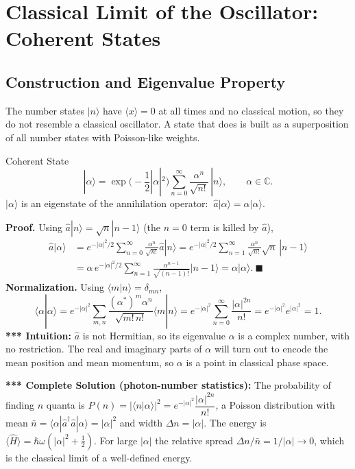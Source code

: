 \documentclass[11pt,a4paper]{article}
\begin{document}
\section{Classical Limit of the Oscillator: Coherent States}
\label{fd:sec:coh}

\subsection{Construction and Eigenvalue Property}
The number states $|n\rangle$ have $\langle x\rangle=0$ at all times and no classical motion, so they do not resemble a classical oscillator. A state that does is built as a superposition of all number states with Poisson-like weights.

\begin{thm}{Coherent State}
\[
|\alpha\rangle=\exp\Big(-\frac12|\alpha|^2\Big)\sum_{n=0}^\infty\frac{\alpha^n}{\sqrt{n!}}\,|n\rangle,\qquad\alpha\in\mathbb C .
\]
$|\alpha\rangle$ is an eigenstate of the annihilation operator: $\ \hat a|\alpha\rangle=\alpha|\alpha\rangle$.
\end{thm}
\textbf{Proof.} Using $\hat a|n\rangle=\sqrt n|n-1\rangle$ (the $n=0$ term is killed by $\hat a$),
\begin{align*}
\hat a|\alpha\rangle&=e^{-|\alpha|^2/2}\sum_{n=0}^\infty\frac{\alpha^n}{\sqrt{n!}}\hat a|n\rangle
=e^{-|\alpha|^2/2}\sum_{n=1}^\infty\frac{\alpha^n}{\sqrt{n!}}\sqrt n\,|n-1\rangle\\
&=\alpha\,e^{-|\alpha|^2/2}\sum_{n=1}^\infty\frac{\alpha^{n-1}}{\sqrt{(n-1)!}}|n-1\rangle=\alpha|\alpha\rangle .\ \blacksquare
\end{align*}
\textbf{Normalization.} Using $\langle m|n\rangle=\delta_{mn}$,
\[
\langle\alpha|\alpha\rangle=e^{-|\alpha|^2}\sum_{m,n}\frac{(\alpha^*)^m\alpha^n}{\sqrt{m!\,n!}}\langle m|n\rangle=e^{-|\alpha|^2}\sum_{n=0}^\infty\frac{|\alpha|^{2n}}{n!}=e^{-|\alpha|^2}e^{|\alpha|^2}=1 .
\]
\textbf{*** Intuition:} $\hat a$ is not Hermitian, so its eigenvalue $\alpha$ is a complex number, with no restriction. The real and imaginary parts of $\alpha$ will turn out to encode the mean position and mean momentum, so $\alpha$ is a point in classical phase space.

\textbf{*** Complete Solution (photon-number statistics):} The probability of finding $n$ quanta is $P(n)=|\langle n|\alpha\rangle|^2=e^{-|\alpha|^2}\dfrac{|\alpha|^{2n}}{n!}$, a Poisson distribution with mean $\bar n=\langle\alpha|\hat a^\dagger\hat a|\alpha\rangle=|\alpha|^2$ and width $\Delta n=|\alpha|$. The energy is $\langle\hat H\rangle=\hbar\omega(|\alpha|^2+\frac12)$. For large $|\alpha|$ the relative spread $\Delta n/\bar n=1/|\alpha|\to0$, which is the classical limit of a well-defined energy.
\end{document}
